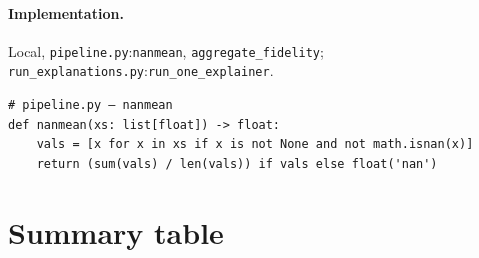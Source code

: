 \documentclass[11pt,a4paper]{article}
\newcommand{\code}[1]{\texttt{#1}}
\begin{document}
\paragraph{Implementation.} Local,
\code{pipeline.py}:\code{nanmean}, \code{aggregate\_fidelity};
\code{run\_explanations.py}:\code{run\_one\_explainer}.

\begin{verbatim}
# pipeline.py — nanmean
def nanmean(xs: list[float]) -> float:
    vals = [x for x in xs if x is not None and not math.isnan(x)]
    return (sum(vals) / len(vals)) if vals else float('nan')
\end{verbatim}


\section{Summary table}
\label{sec:summary}
\end{document}
